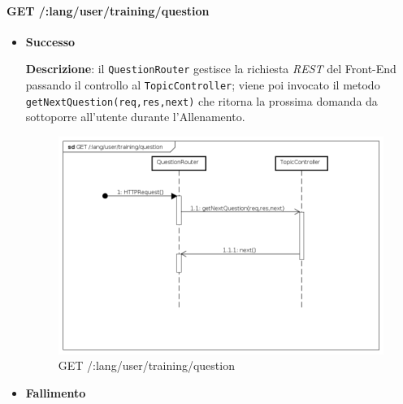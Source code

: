 \paragraph{GET /:lang/user/training/question} %
\begin{itemize}
\item \textbf{Successo}

\textbf{Descrizione}: il \texttt{QuestionRouter} gestisce la richiesta \textit{REST} del Front-End passando il controllo al \texttt{TopicController}; viene poi invocato il metodo\\ \texttt{getNextQuestion(req,res,next)} che ritorna la prossima domanda da sottoporre all'utente durante l'Allenamento. 

\begin{figure}[ht]
	\centering
	\includegraphics[scale=0.45]{UML/DiagrammiDiSequenza/Back-end/GET__lang_user_training_question.png}
	\caption{GET /:lang/user/training/question}
\end{figure}
\FloatBarrier

\item \textbf{Fallimento}
\end{itemize}




